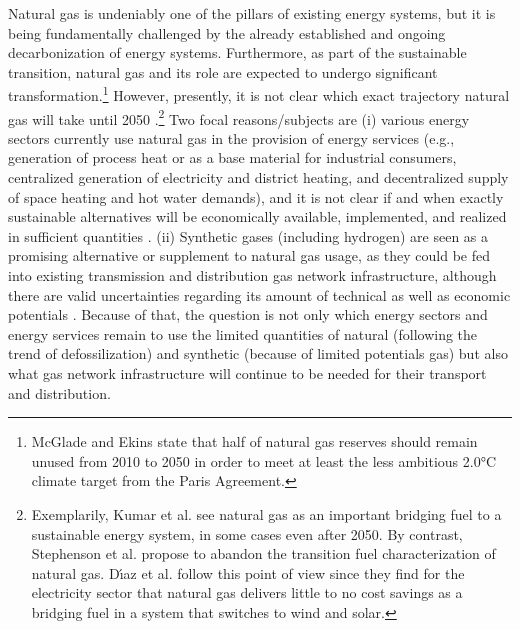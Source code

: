 Natural gas is undeniably one of the pillars of existing energy systems, but it is being fundamentally challenged by the already established and ongoing decarbonization of energy systems. Furthermore, as part of the sustainable transition, natural gas and its role are expected to undergo significant transformation.\footnote{McGlade and Ekins \cite{mcglade2015geographical} state that half of natural gas reserves should remain unused from 2010 to 2050 in order to meet at least the less ambitious 2.0°C climate target from the Paris Agreement.} However, presently, it is not clear which exact trajectory natural gas will take until 2050 \cite{safari2019natural}.\footnote{Exemplarily, Kumar et al. \cite{kumar2011current} see natural gas as an important bridging fuel to a sustainable energy system, in some cases even after 2050. By contrast, Stephenson et al. \cite{stephenson2012greenwashing} propose to abandon the transition fuel characterization of natural gas. D{\'\i}az et al. \cite{diaz2017we} follow this point of view since they find for the electricity sector that natural gas delivers little to no cost savings as a bridging fuel in a system that switches to wind and solar.} Two focal reasons/subjects are (i) various energy sectors currently use natural gas in the provision of energy services (e.g., generation of process heat or as a base material for industrial consumers, centralized generation of electricity and district heating, and decentralized supply of space heating and hot water demands), and it is not clear if and when exactly sustainable alternatives will be economically available, implemented, and realized in sufficient quantities \cite{mohseni2013competitiveness, gorre2019production}. (ii) Synthetic gases (including hydrogen) are seen as a promising alternative or supplement to natural gas usage, as they could be fed into existing transmission and distribution gas network infrastructure, although there are valid uncertainties regarding its amount of technical as well as economic potentials \cite{lux2020supply, blanco2018potential}. Because of that, the question is not only which energy sectors and energy services remain to use the limited quantities of natural (following the trend of defossilization) and synthetic (because of limited potentials gas) but also what gas network infrastructure will continue to be needed for their transport and distribution.\vspace{0.35cm}

